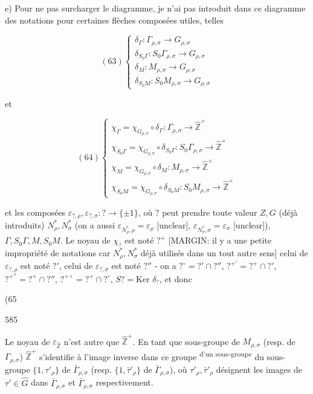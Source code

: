 \begin{enumerate}
\newpage


e) Pour ne pas surcharger le diagramme,
je n'ai pas introduit dans ce diagramme des
notations pour certaines flèches composées utiles,
telles

$$ (63) \left\{ \begin{array}{l} \delta_\Gamma : \Gamma_{\rho,\sigma} \to G_{\rho,\sigma} \\ \delta_{S_0\Gamma} : S_0\Gamma_{\rho,\sigma} \to G_{\rho,\sigma} \\ \delta_M : M_{\rho,\sigma} \to G_{\rho,\sigma} \\ \delta_{S_0M} : S_0M_{\rho,\sigma} \to G_{\rho,\sigma} \end{array} \right. $$

et

$$ (64) \left\{ \begin{array}{l} \chi_\Gamma = \chi_{G_{\rho,\sigma}} \circ \delta_\Gamma : \Gamma_{\rho,\sigma} \to \hat{\mathbb{Z}}^\times \\ \chi_{S_0\Gamma} = \chi_{G_{\rho,\sigma}} \circ \delta_{S_0\Gamma} : S_0\Gamma_{\rho,\sigma} \to \hat{\mathbb{Z}}^\times \\ \chi_M = \chi_{G_{\rho,\sigma}} \circ \delta_M : M_{\rho,\sigma} \to \hat{\mathbb{Z}}^\times \\ \chi_{S_0M} = \chi_{G_{\rho,\sigma}} \circ \delta_{S_0M} : S_0M_{\rho,\sigma} \to \hat{\mathbb{Z}}^\times \end{array} \right. $$

et les composées $\varepsilon_{?,\rho}, \varepsilon_{?,\sigma} : ? \to \{\pm 1\}$, où $?$ peut
prendre toute valeur $Z, G$ (déjà introduits) $N_\rho^*, N_\sigma^*$
(on a aussi $\varepsilon_{N_\rho^*,\rho} = \varepsilon_\rho$ [unclear], $\varepsilon_{N_\sigma^*,\sigma} = \varepsilon_\sigma$ [unclear]),
$\Gamma, S_0\Gamma, M, S_0M$. Le noyau de $\chi_?$ est noté $?^+$
[MARGIN: il y a une petite impropriété de notations car $N_\rho^*, N_\sigma^*$ déjà utilisés dans un tout autre sens]
celui de $\varepsilon_{?,\rho}$ est noté $?'$, celui de $\varepsilon_{?,\sigma}$ est noté $?''$ -
on a $?^\circ = ?' \cap ?''$, $?^{+'} = ?^+ \cap ?'$, $?^{+''} = ?^+ \cap ?''$,
$?^{+\circ} = ?^+ \cap ?^\circ$, $S? = \text{Ker } \delta_?$, et donc

(65

\newpage


585

Le noyau de $\varepsilon_{\hat{\mathbb{Z}}}$ n'est autre que $\hat{\mathbb{Z}}^+$. En tant
que sous-groupe de $M_{\rho,\sigma}$ (resp. de $\Gamma_{\rho,\sigma}$) $\hat{\mathbb{Z}}^+$
s'identifie à l'image inverse dans ce groupe \textsuperscript{d'un sous-groupe}
du sous-groupe $\{1, \tau'_\rho\}$ de $\bar{\Gamma}_{\rho,\sigma}$ (resp. $\{1, \bar{\tau}'_\rho\}$
de $\bar{\Gamma}_{\rho,\sigma}$), où $\tau'_\rho, \bar{\tau}'_\rho$ désignent les
images de $\tau' \in \widehat{G}$ dans $\bar{\Gamma}_{\rho,\sigma}$ et $\bar{\Gamma}_{\rho,\sigma}$ respectivement.


\end{enumerate}

